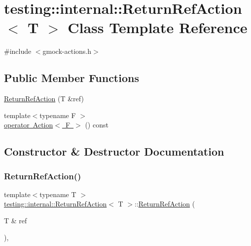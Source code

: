 \hypertarget{classtesting_1_1internal_1_1ReturnRefAction}{}\section{testing\+::internal\+::Return\+Ref\+Action$<$ T $>$ Class Template Reference}
\label{classtesting_1_1internal_1_1ReturnRefAction}


{\ttfamily \#include $<$gmock-\/actions.\+h$>$}

\subsection*{Public Member Functions}
\begin{DoxyCompactItemize}
\item 
\mbox{\hyperlink{classtesting_1_1internal_1_1ReturnRefAction_a1384b1cd78f3069f0493e2302f143701}{Return\+Ref\+Action}} (T \&ref)
\item 
{\footnotesize template$<$typename F $>$ }\\\mbox{\hyperlink{classtesting_1_1internal_1_1ReturnRefAction_a48e5d411097707e558af62eb68edc162}{operator Action$<$ F $>$}} () const
\end{DoxyCompactItemize}


\subsection{Constructor \& Destructor Documentation}
\mbox{\label{classtesting_1_1internal_1_1ReturnRefAction_a1384b1cd78f3069f0493e2302f143701}} 
\subsubsection{\texorpdfstring{ReturnRefAction()}{ReturnRefAction()}}
{\footnotesize\ttfamily template$<$typename T $>$ \\
\mbox{\hyperlink{classtesting_1_1internal_1_1ReturnRefAction}{testing\+::internal\+::\+Return\+Ref\+Action}}$<$ T $>$\+::\mbox{\hyperlink{classtesting_1_1internal_1_1ReturnRefAction}{Return\+Ref\+Action}} (\begin{DoxyParamCaption}\item[{T \&}]{ref }\end{DoxyParamCaption})\hspace{0.3cm}{\ttfamily [inline]}, {\ttfamily [explicit]}}



